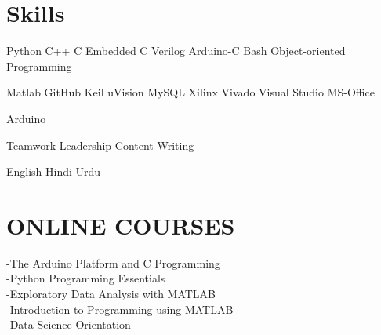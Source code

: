 \documentclass[]{deedy-resume-openfont}
\begin{document}
\begin{minipage}[t]{0.38\textwidth}

\section{Skills}
Python \textbullet{} C++ \textbullet{} C \textbullet{} Embedded C \textbullet{} Verilog  Arduino-C \textbullet{} Bash \textbullet{} Object-oriented Programming\\
\sectionsep

Matlab \textbullet{} GitHub \textbullet{} Keil uVision \textbullet{} MySQL \textbullet{}  Xilinx Vivado \textbullet{} Visual Studio \textbullet{} MS-Office\\
\sectionsep

Arduino 
\sectionsep

Teamwork \textbullet{} Leadership\textbullet{} Content Writing\\
\sectionsep

English \textbullet{} Hindi \textbullet{} Urdu\\
\sectionsep


\section{ONLINE COURSES}
-The Arduino Platform and C Programming\\
-Python Programming Essentials\\
-Exploratory Data Analysis with MATLAB\\
-Introduction to Programming using MATLAB\\


-Data Science Orientation \\

%
%

\end{minipage} 
\hfill
\end{document}
